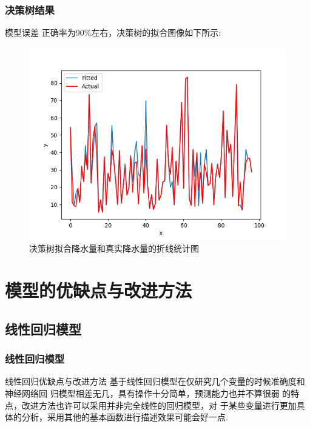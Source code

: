 \documentclass[10pt]{beamer}
\begin{document}
\begin{frame}
	\frametitle{决策树结果}
	\begin{block}{模型误差}
		正确率为$90\%$左右，决策树的拟合图像如下所示:
		\begin{figure}[h!]
			\centering
			\includegraphics[scale=0.4]{../latex/very_success.png}
			\caption{决策树拟合降水量和真实降水量的折线统计图}
		\end{figure}
	\end{block}
\end{frame}

\section{模型的优缺点与改进方法}

\subsection{线性回归模型}
\begin{frame}
	\frametitle{线性回归模型}
	\begin{block}{线性回归优缺点与改进方法}
		基于线性回归模型在仅研究几个变量的时候准确度和神经网络回
		归模型相差无几，具有操作十分简单，预测能力也并不算很弱
		的特点，改进方法也许可以采用并非完全线性的回归模型，对
		于某些变量进行更加具体的分析，采用其他的基本函数进行描述效果可能会好一点.
	\end{block}
\end{frame}
\end{document}
